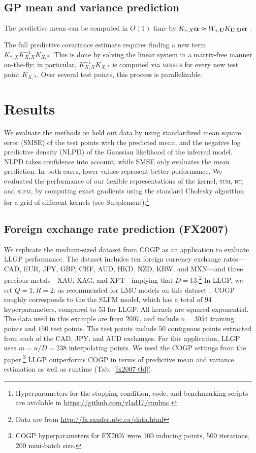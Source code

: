 \documentclass{article}
\begin{document}
\subsection{GP mean and variance prediction}

The predictive mean can be computed in $O(1)$ time by $K_{*,X}{\boldsymbol\alpha}\approx W_{*,\textbf{U}}K_{\textbf{U},\textbf{U}}{\boldsymbol\alpha}$ \cite{msgp}.

The full predictive covariance estimate requires finding a new term $K_{*,X}K_{X,X}^{-1}K_{X,*}$. This is done by solving the linear system in a matrix-free manner on-the-fly; in particular, $K_{X,X}^{-1}K_{X,*}$ is computed via \textsc{minres} for every new test point $K_{X,*}$. Over several test points, this process is parallelizable.

\section{Results}
\label{sec:results}
We evaluate the methods on held out data by using standardized mean square error (SMSE) of the test points with the predicted mean, and the negative log predictive density (NLPD) of the Gaussian likelihood of the inferred model. NLPD takes confidence into account, while SMSE only evaluates the mean prediction. In both cases, lower values represent better performance. We evaluated the performance of our flexible representations of the kernel, \textsc{sum}, \textsc{bt}, and \textsc{slfm}, by computing exact gradients using the standard Cholesky algorithm for a grid of different kernels (see Supplement).\footnote{Hyperparameters for the stopping condition, code, and benchmarking scripts are available in \url{https://github.com/vlad17/runlmc}.}

\subsection{Foreign exchange rate prediction (FX2007)}\label{fx2007-results}

We replicate the medium-sized dataset from COGP as an application to evaluate LLGP performance. The dataset includes ten foreign currency exchange rates---CAD, EUR, JPY, GBP, CHF, AUD, HKD, NZD, KRW, and MXN---and three precious metals---XAU, XAG, and XPT---implying that $D=13$.\footnote{Data are from \url{http://fx.sauder.ubc.ca/data.html}} In LLGP, we set $Q=1,R=2$, as recommended for LMC models on this dataset~\cite{alvarez2010efficient}. COGP roughly corresponds to the the SLFM model, which has a total of 94 hyperparameters, compared to 53 for LLGP. All kernels are squared exponential. The data used in this example are from 2007, and include $n=3054$ training points and $150$ test points. The test points include 50 contiguous points extracted from each of the CAD, JPY, and AUD exchanges. For this application, LLGP uses $m=n/D=238$ interpolating points. We used the COGP settings from the paper.\footnote{COGP hyperparameters for FX2007 were 100 inducing points, 500 iterations, 200 mini-batch size.} LLGP outperforms COGP in terms of predictive mean and variance estimation as well as runtime (Tab.~\ref{fx2007-tbl}).
\end{document}
